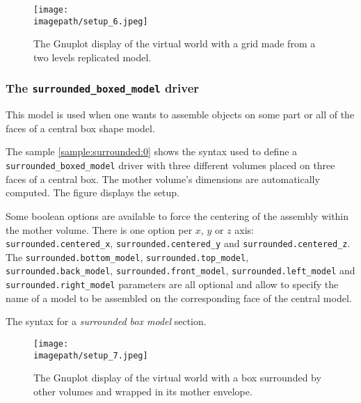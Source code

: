 \begin{figure}[h]
\begin{center}
\texttt{[image: \\imagepath/setup\_6.jpeg]}
\end{center}
\caption{The Gnuplot  display of  the virtual world  with a  grid made
  from a two levels replicated model.}
\label{fig:setup_6:0}
\end{figure}

\subsubsection{The \texttt{surrounded\_boxed\_model} driver}

This model is used when one  wants to assemble objects on some part or
all of the faces of a central box shape model.

The sample \ref{sample:surrounded:0} shows the syntax used to define a
\texttt{surrounded\_boxed\_model} driver  with three different volumes
placed  on  three  faces  of  a  central  box.   The  mother  volume's
dimensions        are        automatically        computed.        The
figure \label{fig:setup_7:0} displays the setup.

Some  boolean options  are available  to  force the  centering of  the
assembly within the mother volume. There is one option per $x$, $y$ or
$z$               axis:               \texttt{surrounded.centered\_x},
\texttt{surrounded.centered\_y}  and  \texttt{surrounded.centered\_z}.
The \texttt{surrounded.bottom\_model}, \texttt{surrounded.top\_model},
\texttt{surrounded.back\_model},      \texttt{surrounded.front\_model},
\texttt{surrounded.left\_model}  and  \texttt{surrounded.right\_model}
parameters are all  optional and allow to specify the  name of a model
to be assembled on the corresponding face of the central model.

\begin{sample}[h]
\caption{The syntax for a \emph{surrounded box model} section.}
\label{sample:surrounded:0}
\end{sample}


\begin{figure}[h]
\begin{center}
\texttt{[image: \\imagepath/setup\_7.jpeg]}
\end{center}
\caption{The  Gnuplot  display  of   the  virtual  world  with  a  box
  surrounded by other volumes and wrapped in its mother envelope.}
\label{fig:setup_7:0}
\end{figure}


